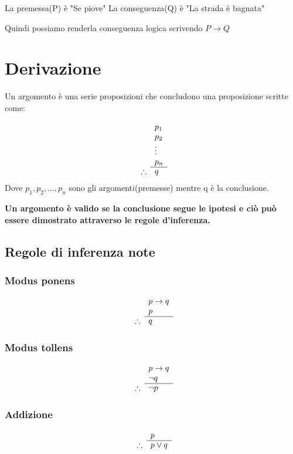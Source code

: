 \documentclass[a4paper]{article}
\begin{document}
La premessa(P) è "Se piove"
La conseguenza(Q) è "La strada è bagnata"

Quindi possiamo renderla conseguenza logica scrivendo $ P \rightarrow Q $

\section{Derivazione}

Un argomento è una serie proposizioni che concludono una proposizione scritte come: 

\[
\begin{array}{ r l }
	& p_1 \\
	& p_2 \\
	& \vdots \\
	& p_n \\
	\cline{2-2}
	\therefore & q
\end{array}
\]
Dove $ p_1, p_2, ..., p_n $ sono gli argomenti(premesse) mentre q è la conclusione.

\textbf{Un argomento è valido se la conclusione segue le ipotesi e ciò può essere dimostrato attraverso le regole d'inferenza.}

\subsection{Regole di inferenza note}

\subsubsection{Modus ponens}
\[
\begin{array}{ r l }
	& p \rightarrow q \\
	& p \\
	\cline{2-2}
	\therefore & q
\end{array}
\]

\subsubsection{Modus tollens}
\[
\begin{array}{ r l }
	& p \rightarrow q \\
	& \neg q \\
	\cline{2-2}
	\therefore & \neg p
\end{array}
\]

\subsubsection{Addizione}
\[
\begin{array}{ r l }
	& p \\
	\cline{2-2}
	\therefore & p \lor q
\end{array}
\]\\
\end{document}
